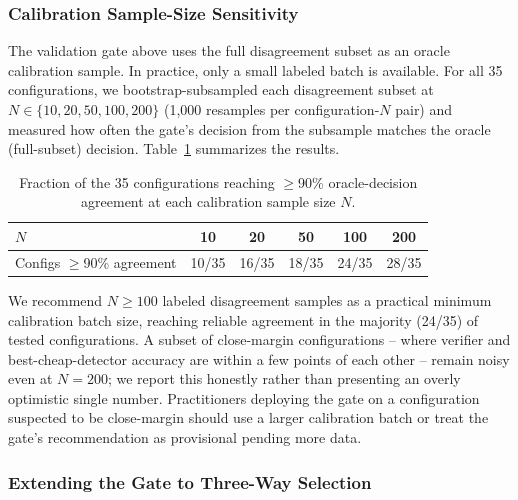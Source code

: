 
\subsubsection{Calibration Sample-Size Sensitivity}

The validation gate above uses the full disagreement subset as an oracle
calibration sample. In practice, only a small labeled batch is available.
For all 35 configurations, we bootstrap-subsampled each disagreement subset
at $N \in \{10, 20, 50, 100, 200\}$ (1{,}000 resamples per configuration-$N$
pair) and measured how often the gate's decision from the subsample matches
the oracle (full-subset) decision. Table~\ref{tab:sensitivity} summarizes
the results.

\begin{table}[h]
\centering
\small
\caption{Fraction of the 35 configurations reaching $\geq$90\% oracle-decision agreement at each calibration sample size $N$.}
\label{tab:sensitivity}
\begin{tabular}{lccccc}
\toprule
$N$ & 10 & 20 & 50 & 100 & 200 \\
\midrule
Configs $\geq$90\% agreement & 10/35 & 16/35 & 18/35 & 24/35 & 28/35 \\
\bottomrule
\end{tabular}
\end{table}

We recommend $N \geq 100$ labeled disagreement samples as a practical
minimum calibration batch size, reaching reliable agreement in the
majority (24/35) of tested configurations. A subset of close-margin
configurations -- where verifier and best-cheap-detector accuracy are
within a few points of each other -- remain noisy even at $N=200$; we
report this honestly rather than presenting an overly optimistic single
number. Practitioners deploying the gate on a configuration suspected to
be close-margin should use a larger calibration batch or treat the gate's
recommendation as provisional pending more data.



\subsubsection{Extending the Gate to Three-Way Selection}
\label{sec:threeway}

